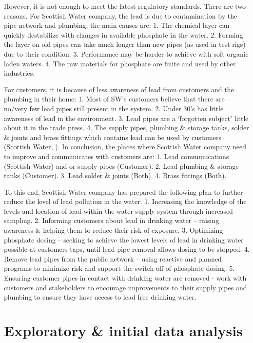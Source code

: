 \documentclass[11pt,twoside]{article}
\numberwithin{Theorem}{section}
\numberwithin{Definition}{section}
\numberwithin{Lemma}{section}
\numberwithin{Algorithm}{section}
\numberwithin{equation}{section}
\begin{document}
However, it is not enough to meet the latest regulatory standards. There are two reasons.
For Scottish Water company, the lead is due to contamination by the pipe network and plumbing, the main causes are: 1. The chemical layer can quickly destabilize with changes in available phosphate in the water. 2. Forming the layer on old pipes can take much longer than new pipes (as used in test rigs) due to their condition. 3. Performance may be harder to achieve with soft organic laden waters. 4. The raw materials for phosphate are finite and used by other industries.

For customers, it is because of less awareness of lead from customers and the plumbing in their home: 1. Most of SW’s customers believe that there are no/very few lead pipes still present in the system. 2. Under 30’s has little awareness of lead in the environment. 3. Lead pipes are a ‘forgotten subject’ little about it in the trade press. 4. The supply pipes, plumbing \& storage tanks, solder \& joints and brass fittings which contains lead can be used by customers (Scottish Water, \citeyear{sw2}).
In conclusion, the places where Scottish Water company need to improve and communicates with customers are: 1. Lead communications (Scottish Water) and or supply pipes (Customer). 2. Lead plumbing \& storage tanks (Customer). 3. Lead solder \& joints (Both). 4. Brass fittings (Both).

To this end, Scottish Water company has prepared the following plan to further reduce the level of lead pollution in the water. 1. Increasing the knowledge of the levels and location of lead within the water supply system through increased sampling. 2. Informing customers about lead in drinking water – raising awareness \& helping them to reduce their risk of exposure. 3. Optimizing phosphate dosing – seeking to achieve the lowest levels of lead in drinking water possible at customers taps, until lead pipe removal allows dosing to be stopped. 4. Remove lead pipes from the public network – using reactive and planned programs to minimize risk and support the switch off of phosphate dosing. 5. Ensuring customer pipes in contact with drinking water are removed - work with customers and stakeholders to encourage improvements to their supply pipes and plumbing to ensure they have access to lead free drinking water.

\clearpage

\section{Exploratory \& initial data analysis}
\label{sec.explore}
\end{document}
